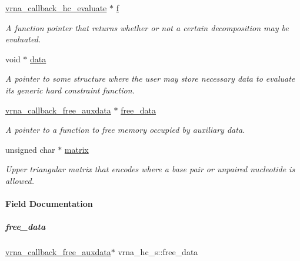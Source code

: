 \begin{DoxyCompactItemize}
\mbox{\hyperlink{group__hard__constraints_gae465f1d4a3d8b6592b38ecbb0d9f613d}{vrna\+\_\+callback\+\_\+hc\+\_\+evaluate}} $\ast$ \mbox{\hyperlink{group__hard__constraints_a85714afbf27012165ec80c564bd62931}{f}}
\begin{DoxyCompactList}\small\item\em A function pointer that returns whether or not a certain decomposition may be evaluated. \end{DoxyCompactList}\item 
\mbox{\label{group__hard__constraints_acef3d722142cb5f4a8e114e5fbce3b1a}} 
void $\ast$ \mbox{\hyperlink{group__hard__constraints_acef3d722142cb5f4a8e114e5fbce3b1a}{data}}
\begin{DoxyCompactList}\small\item\em A pointer to some structure where the user may store necessary data to evaluate its generic hard constraint function. \end{DoxyCompactList}\item 
\mbox{\hyperlink{group__fold__compound_ga7806651f51b195013839a218b3bbd5a3}{vrna\+\_\+callback\+\_\+free\+\_\+auxdata}} $\ast$ \mbox{\hyperlink{group__hard__constraints_a970e0e202c9e46ebc7640ddc43357ba6}{free\+\_\+data}}
\begin{DoxyCompactList}\small\item\em A pointer to a function to free memory occupied by auxiliary data. \end{DoxyCompactList}\item 
\mbox{\label{group__hard__constraints_a6ff99f530ca7ca9719e164321d051bde}} 
unsigned char $\ast$ \mbox{\hyperlink{group__hard__constraints_a6ff99f530ca7ca9719e164321d051bde}{matrix}}
\begin{DoxyCompactList}\small\item\em Upper triangular matrix that encodes where a base pair or unpaired nucleotide is allowed. \end{DoxyCompactList}\end{DoxyCompactItemize}


\paragraph{Field Documentation}
\mbox{\label{group__hard__constraints_a970e0e202c9e46ebc7640ddc43357ba6}} 
\subparagraph{\texorpdfstring{free\_data}{free\_data}}
{\footnotesize\ttfamily \mbox{\hyperlink{group__fold__compound_ga7806651f51b195013839a218b3bbd5a3}{vrna\+\_\+callback\+\_\+free\+\_\+auxdata}}$\ast$ vrna\+\_\+hc\+\_\+s\+::free\+\_\+data}



